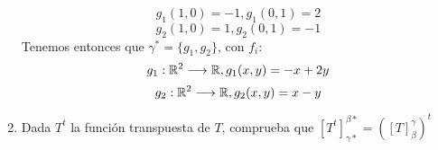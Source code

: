 \begin{enumerate}
\begin{equation*}
        g_1(1,0)=-1, g_1(0,1)=2 
    \end{equation*}
    \begin{equation*}
        g_2(1,0)=1, g_2(0,1)=-1 
    \end{equation*}
    Tenemos entonces que $\gamma^*=\{g_1,g_2\}$, con $f_i$:\\
    \begin{equation*}
        g_1:\mathbb{R}^2\longrightarrow \mathbb{R} ,g_1(x,y)=-x+2y
    \end{equation*}
    \begin{equation*}
        g_2:\mathbb{R}^2\longrightarrow \mathbb{R} ,g_2(x,y)=x-y
    \end{equation*}

    \item Dada $T^{t}$ la función transpuesta de $T$, comprueba que $\left[ T^{t} \right]_{\gamma *}^{\beta *} = \left( \left[ T \right]_{\beta}^{\gamma} \right)^{t}$

    \noindent \solucion \\


\end{enumerate}
